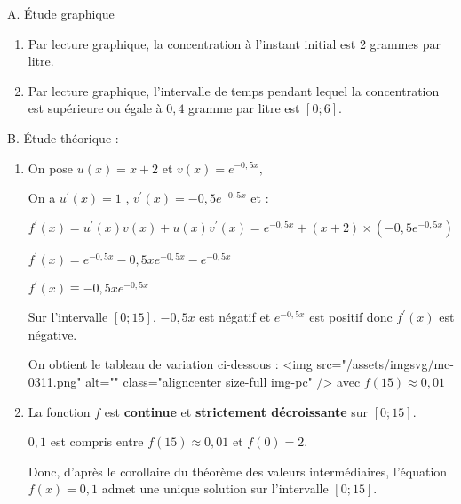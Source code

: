 \begin{corrige}
     \begin{h3}A. Étude graphique\end{h3}
     \begin{enumerate}
          \item
          Par lecture graphique, la concentration à l'instant initial est 2 grammes par litre.
          \item
          Par lecture graphique, l'intervalle de temps pendant lequel la concentration est supérieure ou égale à $0,4$ gramme par litre est $\left[0;6\right]$.
     \end{enumerate}
     \begin{h3}B. Étude théorique :\end{h3}
     \begin{enumerate}
          \item
          On pose $u\left(x\right)=x+2$ et $v\left(x\right)=e^{- 0,5x},$
          \par
          On a $u^{\prime}\left(x\right)=1$ , $v^{\prime}\left(x\right)=-0,5e^{- 0,5x}$ et :
          \par
          $f^{\prime}\left(x\right)=u^{\prime}\left(x\right)v\left(x\right)+u\left(x\right)v^{\prime}\left(x\right)=e^{- 0,5x}+\left(x+2\right)\times \left(-0,5e^{- 0,5x}\right)$
          \par
          $f^{\prime}\left(x\right)=e^{- 0,5x}-0,5xe^{- 0,5x}-e^{- 0,5x}$
          \par
          $f^{\prime}\left(x\right)\equiv -0,5xe^{- 0,5x}$
          \par
          Sur l'intervalle $\left[0 ; 15\right]$, $-0,5x$ est négatif et  $e^{- 0,5x}$ est positif donc $f^{\prime}\left(x\right)$ est négative.
          \par
          On obtient le tableau de variation ci-dessous :
          <img src="/assets/imgsvg/mc-0311.png" alt="" class="aligncenter size-full  img-pc" />
          avec $f\left(15\right)\approx 0,01$
          \item
          La fonction $f$ est \textbf{continue} et \textbf{strictement décroissante} sur $\left[0; 15\right]$.
          \par
          $0,1$ est compris entre $f\left(15\right)\approx 0,01$ et $f\left(0\right)=2$.
          \par
          Donc, d'après le corollaire du théorème des valeurs intermédiaires, l'équation $f\left(x\right)=0,1$ admet une unique solution sur l'intervalle $\left[0; 15\right]$.

\end{enumerate}
\end{corrige}
